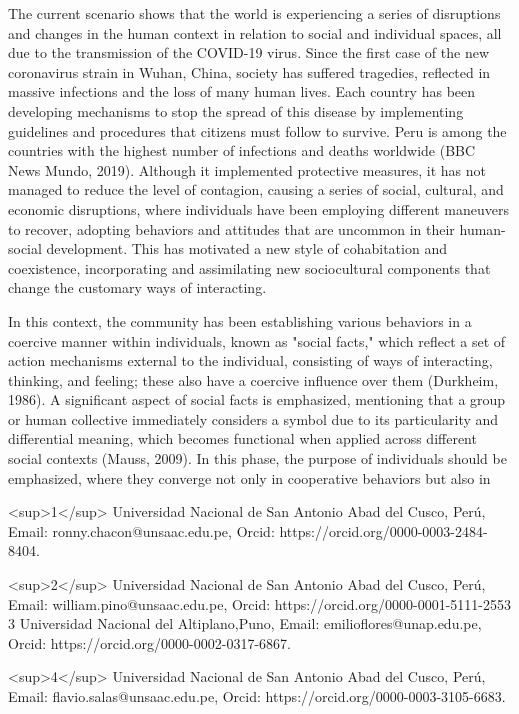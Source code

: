 \documentclass{article}
\begin{document}
The current scenario shows that the world is experiencing a series of disruptions and changes in the human context in relation to social and individual spaces, all due to the transmission of the COVID-19 virus. Since the first case of the new coronavirus strain in Wuhan, China, society has suffered tragedies, reflected in massive infections and the loss of many human lives. Each country has been developing mechanisms to stop the spread of this disease by implementing guidelines and procedures that citizens must follow to survive. Peru is among the countries with the highest number of infections and deaths worldwide (BBC News Mundo, 2019). Although it implemented protective measures, it has not managed to reduce the level of contagion, causing a series of social, cultural, and economic disruptions, where individuals have been employing different maneuvers to recover, adopting behaviors and attitudes that are uncommon in their human-social development. This has motivated a new style of cohabitation and coexistence, incorporating and assimilating new sociocultural components that change the customary ways of interacting.

In this context, the community has been establishing various behaviors in a coercive manner within individuals, known as "social facts," which reflect a set of action mechanisms external to the individual, consisting of ways of interacting, thinking, and feeling; these also have a coercive influence over them (Durkheim, 1986). A significant aspect of social facts is emphasized, mentioning that a group or human collective immediately considers a symbol due to its particularity and differential meaning, which becomes functional when applied across different social contexts (Mauss, 2009). In this phase, the purpose of individuals should be emphasized, where they converge not only in cooperative behaviors but also in

<sup>1</sup> Universidad Nacional de San Antonio Abad del Cusco, Perú, Email: ronny.chacon@unsaac.edu.pe, Orcid: https://orcid.org/0000-0003-2484- 8404.

<sup>2</sup> Universidad Nacional de San Antonio Abad del Cusco, Perú, Email: william.pino@unsaac.edu.pe, Orcid: https://orcid.org/0000-0001-5111-2553 3 Universidad Nacional del Altiplano,Puno, Email: emilioflores@unap.edu.pe, Orcid: https://orcid.org/0000-0002-0317-6867.

<sup>4</sup> Universidad Nacional de San Antonio Abad del Cusco, Perú, Email: flavio.salas@unsaac.edu.pe, Orcid: https://orcid.org/0000-0003-3105-6683.
\end{document}
